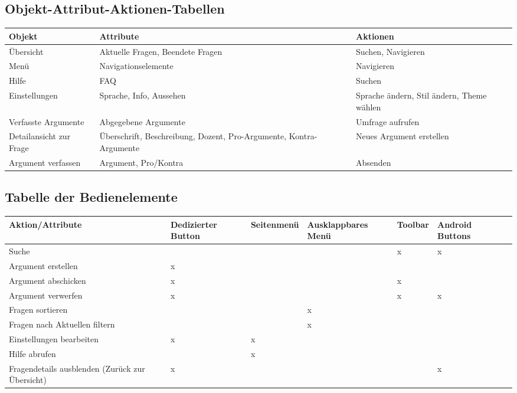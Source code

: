 \clearpage
\subsection{Objekt-Attribut-Aktionen-Tabellen}
\label{sec:objektattribut}

\begin{tabular}{l p{5cm} p{5cm}}
Objekt & Attribute & Aktionen \\
\hline
Übersicht & Aktuelle Fragen, Beendete Fragen & Suchen, Navigieren\\
Menü & Navigationselemente & Navigieren\\
Hilfe & FAQ & Suchen\\
Einstellungen & Sprache, Info, Aussehen & Sprache ändern, Stil ändern, Theme wählen\\
Verfasste Argumente & Abgegebene Argumente & Umfrage aufrufen\\
Detailansicht zur Frage & Überschrift, Beschreibung, Dozent, Pro-Argumente, Kontra-Argumente & Neues Argument erstellen\\
Argument verfassen &Argument, Pro/Kontra & Absenden\\
\end{tabular}

\subsection{Tabelle der Bedienelemente}
\label{sec:bedienelemente}

\bgroup
\def\arraystretch{1.5}
\begin{tabular}{p{4.5cm} | p{1.8cm} p{2cm} p{2.5cm} p{2cm} p{1.8cm} p{2cm}}
Aktion/Attribute & Dedizierter Button & Seitenmenü & Ausklappbares Menü & Toolbar & Android Buttons\\
\hline
Suche &  &  &  & x & x\\
Argument erstellen & x &  &  &  & \\
Argument abschicken & x &  &  & x & \\
Argument verwerfen & x &  &  & x & x\\
Fragen sortieren &  &  & x &  & \\
Fragen nach Aktuellen filtern &  &  & x &  & \\
Einstellungen bearbeiten & x & x &  &  & \\
Hilfe abrufen &  & x &  &  & \\
Fragendetails ausblenden (Zurück zur Übersicht) & x &  &  &  & x\\
\end{tabular}
\egroup

\clearpage
